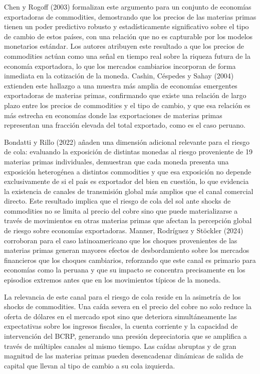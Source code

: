 ﻿\documentclass[11pt,a4paper]{article}
\begin{document}
Chen y Rogoff (2003) formalizan este argumento para un conjunto de economías exportadoras de commodities, demostrando que los precios de las materias primas tienen un poder predictivo robusto y estadísticamente significativo sobre el tipo de cambio de estos países, con una relación que no es capturable por los modelos monetarios estándar. Los autores atribuyen este resultado a que los precios de commodities actúan como una señal en tiempo real sobre la riqueza futura de la economía exportadora, lo que los mercados cambiarios incorporan de forma inmediata en la cotización de la moneda. Cashin, Céspedes y Sahay (2004) extienden este hallazgo a una muestra más amplia de economías emergentes exportadoras de materias primas, confirmando que existe una relación de largo plazo entre los precios de commodities y el tipo de cambio, y que esa relación es más estrecha en economías donde las exportaciones de materias primas representan una fracción elevada del total exportado, como es el caso peruano.

Bondatti y Rillo (2022) añaden una dimensión adicional relevante para el riesgo de cola: evaluando la exposición de distintas monedas al riesgo proveniente de 19 materias primas individuales, demuestran que cada moneda presenta una exposición heterogénea a distintos commodities y que esa exposición no depende exclusivamente de si el país es exportador del bien en cuestión, lo que evidencia la existencia de canales de transmisión global más amplios que el canal comercial directo. Este resultado implica que el riesgo de cola del sol ante shocks de commodities no se limita al precio del cobre sino que puede materializarse a través de movimientos en otras materias primas que afectan la percepción global de riesgo sobre economías exportadoras. Manner, Rodríguez y Stöckler (2024) corroboran para el caso latinoamericano que los choques provenientes de las materias primas generan mayores efectos de desbordamiento sobre los mercados financieros que los choques cambiarios, reforzando que este canal es primario para economías como la peruana y que su impacto se concentra precisamente en los episodios extremos antes que en los movimientos típicos de la moneda. 

La relevancia de este canal para el riesgo de cola reside en la asimetría de los shocks de commodities. Una caída severa en el precio del cobre no solo reduce la oferta de dólares en el mercado spot sino que deteriora simultáneamente las expectativas sobre los ingresos fiscales, la cuenta corriente y la capacidad de intervención del BCRP, generando una presión depreciatoria que se amplifica a través de múltiples canales al mismo tiempo. Las caídas abruptas y de gran magnitud de las materias primas pueden desencadenar dinámicas de salida de capital que llevan al tipo de cambio a su cola izquierda.
\end{document}
